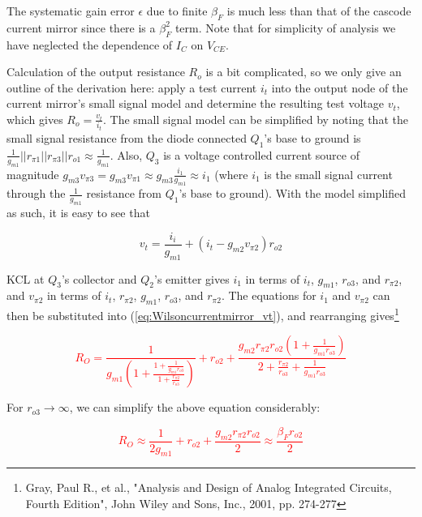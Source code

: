 The systematic gain error $\epsilon$ due to finite $\beta_{F}$ is much less than that of the cascode current mirror since there is a $\beta_{F}^{2}$ term. Note that for simplicity of analysis we have neglected the dependence of $I_{C}$ on $V_{CE}$.
\par Calculation of the output resistance $R_{o}$ is a bit complicated, so we only give an outline of the derivation here: apply a test current $i_{t}$ into the output node of the current mirror's small signal model and determine the resulting test voltage $v_{t}$, which gives $R_{o} = \frac{v_{t}}{i_{t}}$. The small signal model can be simplified by noting that the small signal resistance from the diode connected $Q_{1}$'s base to ground is $\frac{1}{g_{m1}}||r_{\pi1}||r_{\pi3}||r_{o1} \approx \frac{1}{g_{m1}}$. Also, $Q_{3}$ is a voltage controlled current source of magnitude $g_{m3}v_{\pi3} = g_{m3}v_{\pi1} \approx g_{m3}\frac{i_{1}}{g_{m1}} \approx i_{1}$ (where $i_{1}$ is the small signal current through the $\frac{1}{g_{m1}}$ resistance from $Q_{1}$'s base to ground). With the model simplified as such, it is easy to see that

\begin{equation}
v_{t} = \frac{i_{i}}{g_{m1}} + (i_{t} - g_{m2}v_{\pi2})r_{o2}
\label{eq:Wilsoncurrentmirror_vt}
\end{equation}

KCL at $Q_{3}$'s collector and $Q_{2}$'s emitter gives $i_{1}$ in terms of $i_{t}$, $g_{m1}$, $r_{o3}$, and $r_{\pi2}$, and $v_{\pi2}$ in terms of $i_{t}$, $r_{\pi2}$, $g_{m1}$, $r_{o3}$, and $r_{\pi2}$. The equations for $i_{1}$ and $v_{\pi2}$ can then be substituted into (\ref{eq:Wilsoncurrentmirror_vt}), and rearranging gives\footnote{Gray, Paul R., et al., "Analysis and Design of Analog Integrated Circuits, Fourth Edition", John Wiley and Sons, Inc., 2001, pp. 274-277}

\textcolor{red}{
\begin{equation}
R_{O} = \frac{1}{g_{m1}\left(1 + \frac{1+\frac{1}{g_{m1}r_{o3}}}{1+\frac{r_{\pi2}}{r_{o3}}}\right)} + r_{o2} + \frac{g_{m2}r_{\pi2}r_{o2}\left(1+\frac{1}{g_{m1}r_{o3}}\right)}{2 + \frac{r_{\pi2}}{r_{o3}} + \frac{1}{g_{m1}r_{o3}}}
\end{equation}
}

For $r_{o3} \rightarrow \infty$, we can simplify the above equation considerably:

\textcolor{red}{
\begin{equation}
R_{O} \approx \frac{1}{2g_{m1}} + r_{o2} + \frac{g_{m2}r_{\pi2}r_{o2}}{2} \approx \frac{\beta_{F} r_{o2}}{2}
\end{equation}
}

